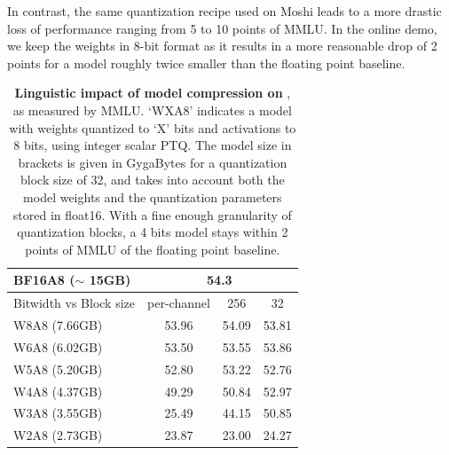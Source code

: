 In contrast, the same quantization recipe used on Moshi leads to a more drastic loss of performance ranging from 5 to 10 points of MMLU.
In the online demo, we keep the weights in 8-bit format as it results in a more reasonable drop of 2 points for a model roughly twice smaller than the floating point baseline.
\begin{table}[tbh]
    \caption{\label{tab:quanthelium}\textbf{Linguistic impact of model compression on \helium}, as measured by MMLU. `WXA8' indicates a model with weights quantized to `X' bits and activations to 8 bits, using integer scalar PTQ.  The model size in brackets is given in GygaBytes for a quantization block size of 32,  and takes into account both the model weights and the quantization parameters stored in float16.
    With a fine enough granularity of quantization blocks, a 4 bits model stays within 2 points of MMLU of the floating point baseline. 
    }
    \centering
    \begin{tabular}{lccc}
        \toprule
       BF16A8 ($\sim$ 15GB)& \multicolumn{3}{c}{54.3} \\
        \midrule
        Bitwidth vs Block size & per-channel & 256 & 32 \\
        \midrule
         W8A8  (7.66GB) &  53.96 & 54.09 & 53.81\\
         W6A8 (6.02GB)  &  53.50&  53.55&  53.86\\
         W5A8  (5.20GB) &  52.80&  53.22& 52.76\\
         W4A8 (4.37GB)  & 49.29 & 50.84 & 52.97 \\
         W3A8 (3.55GB) & 25.49 & 44.15 & 50.85\\
         W2A8 (2.73GB)  & 23.87 &23.00 & 24.27\\
    \bottomrule
    \end{tabular}
\end{table}

